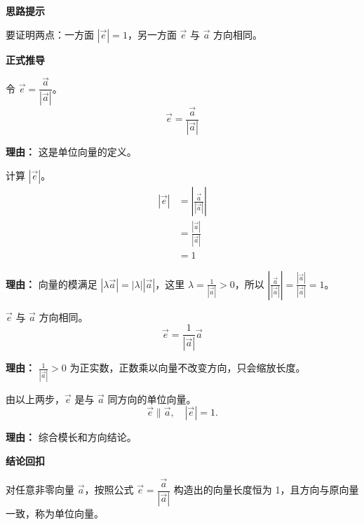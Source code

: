 \begin{proofbox}
	\textbf{\textcolor{CProof}{思路提示}}

	要证明两点：一方面 $|\vec{e}|=1$，另一方面 $\vec{e}$ 与 $\vec{a}$ 方向相同。

	\medskip
	\textbf{\textcolor{CProof}{正式推导}}
	\begin{description}[style=nextline, leftmargin=2.8em, labelsep=0.5em, itemsep=0.55em]
		\item[\textbf{步骤一（构造表达式）：}] 令 $\vec{e} = \dfrac{\vec{a}}{|\vec{a}|}$。
			\[
				\vec{e} = \frac{\vec{a}}{|\vec{a}|}
			\]
			\par\textbf{理由：}
			这是单位向量的定义。

		\item[\textbf{步骤二（计算模长）：}] 计算 $|\vec{e}|$。
			\[
				\begin{aligned}
					|\vec{e}| &= \left| \frac{\vec{a}}{|\vec{a}|} \right| \\
					&= \frac{|\vec{a}|}{|\vec{a}|} \\
					&= 1
			\end{aligned}
			\]
			\par\textbf{理由：}
			向量的模满足 $|\lambda\vec{a}| = |\lambda||\vec{a}|$，这里 $\lambda = \frac{1}{|\vec{a}|} > 0$，所以 $\left|\frac{\vec{a}}{|\vec{a}|}\right| = \frac{|\vec{a}|}{|\vec{a}|}=1$。

		\item[\textbf{步骤三（判断方向）：}] $\vec{e}$ 与 $\vec{a}$ 方向相同。
			\[
				\vec{e} = \frac{1}{|\vec{a}|}\vec{a}
			\]
			\par\textbf{理由：}
			$\frac{1}{|\vec{a}|} > 0$ 为正实数，正数乘以向量不改变方向，只会缩放长度。

		\item[\textbf{步骤四（归纳结论）：}] 由以上两步，$\vec{e}$ 是与 $\vec{a}$ 同方向的单位向量。
			\[
				\vec{e} \parallel \vec{a}, \quad |\vec{e}| = 1.
			\]
			\par\textbf{理由：}
			综合模长和方向结论。
	\end{description}

	\medskip
	\textbf{\textcolor{CProof}{结论回扣}}

	对任意非零向量 $\vec{a}$，按照公式 $\vec{e} = \dfrac{\vec{a}}{|\vec{a}|}$ 构造出的向量长度恒为 1，且方向与原向量一致，称为单位向量。
\end{proofbox}
